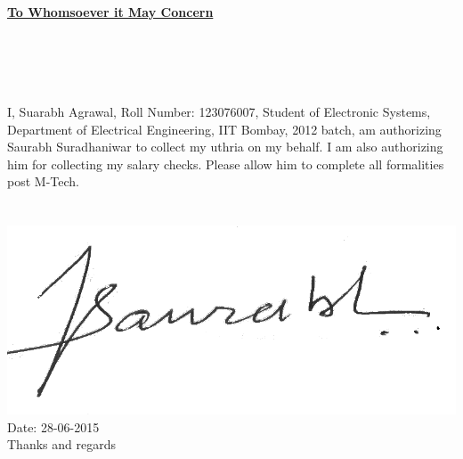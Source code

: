 \documentclass[12pt,a4paper]{report}
\begin{document}
\begin{centering}
\huge
\textbf{\underline{To Whomsoever it May Concern}}
\end{centering}\\ \\ \\ \\ 

I, Suarabh Agrawal, Roll Number: 123076007, Student of Electronic Systems, Department of Electrical Engineering, IIT Bombay, 2012 batch, am authorizing Saurabh Suradhaniwar to collect my uthria on my behalf. I am also authorizing him for collecting my salary checks. Please allow him to complete all formalities post M-Tech.\\ \\ \\ 

\flushleft
\includegraphics[scale=0.25]{./figs/signature}\\
Date: 28-06-2015\\
Thanks and regards
\end{document}
